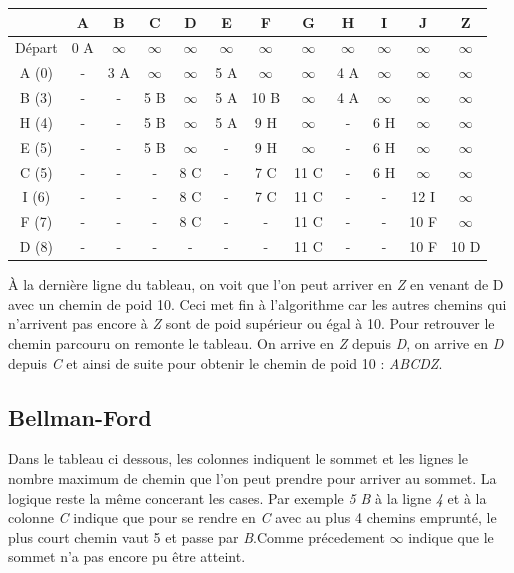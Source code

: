 \documentclass{article}
\begin{document}
\begin{tabular}{|c|c|c|c|c|c|c|c|c|c|c|c|}
	\hline
	& A & B & C & D & E & F & G & H & I & J & Z\\
	\hline
	Départ & 0 A & $\infty$ & $\infty$ & $\infty$ & $\infty$ & $\infty$ & $\infty$ & $\infty$ & $\infty$ & $\infty$ & $\infty$\\
	\hline 
	A (0) & - & 3 A & $\infty$ & $\infty$ & 5 A & $\infty$ & $\infty$ & 4 A & $\infty$ & $\infty$ & $\infty$\\
	\hline
	B (3) & - & - & 5 B & $\infty$ & 5 A & 10 B & $\infty$ & 4 A & $\infty$ & $\infty$ & $\infty$\\
	\hline
	H (4) & - & - & 5 B & $\infty$ & 5 A & 9 H & $\infty$ & - & 6 H & $\infty$ & $\infty$\\
	\hline
	E (5) & - & - & 5 B & $\infty$ & - & 9 H & $\infty$ & - & 6 H & $\infty$ & $\infty$\\
	\hline
	C (5) & - & - & - & 8 C & - & 7 C & 11 C & - & 6 H & $\infty$ & $\infty$\\
	\hline
	I (6) & - & - & - & 8 C & - & 7 C & 11 C & - & - & 12 I & $\infty$\\
	\hline
	F (7) & - & - & - & 8 C & - & - & 11 C & - & - & 10 F & $\infty$\\
	\hline
	D (8) & - & - & - & - & - & - & 11 C & - & - & 10 F & 10 D\\
	\hline
\end{tabular}

\hfill

\hfill

À la dernière ligne du tableau, on voit que l'on peut arriver en \emph{Z} en venant de D avec un chemin de poid 10. Ceci met fin à l'algorithme car les autres chemins qui n'arrivent pas encore à \emph{Z} sont de poid supérieur ou égal à 10. Pour retrouver le chemin parcouru on remonte le tableau. On arrive en \emph{Z} depuis \emph{D}, on arrive en \emph{D} depuis \emph{C} et ainsi de suite pour obtenir le chemin  de poid 10 : \emph{ABCDZ}.

\subsection{Bellman-Ford}

Dans le tableau ci dessous, les colonnes indiquent le sommet et les lignes le nombre maximum de chemin que l'on peut prendre pour arriver au sommet. La logique reste la même concerant les cases. Par exemple \emph{5 B} à la ligne \emph{4} et à la colonne \emph{C} indique que pour se rendre en \emph{C} avec au plus 4 chemins emprunté, le plus court chemin vaut 5 et passe par \emph{B}.Comme précedement $\infty$ indique que le sommet n'a pas encore pu être atteint.
\end{document}
